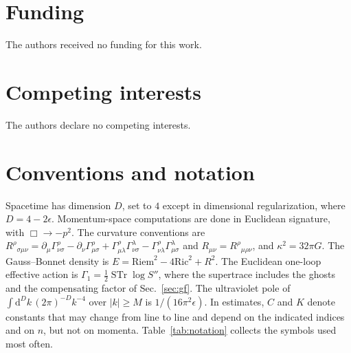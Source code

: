 \documentclass[aps,prd,10pt,twocolumn,superscriptaddress,nofootinbib,floatfix,longbibliography]{revtex4-2}
\newcommand{\dd}{\mathrm{d}}
\newcommand{\Ric}{\mathrm{Ric}}
\newcommand{\Riem}{\mathrm{Riem}}
\begin{document}
\section*{Funding}

The authors received no funding for this work.

\section*{Competing interests}

The authors declare no competing interests.

\appendix

\section{Conventions and notation}
\label{app:conventions}

Spacetime has dimension $D$, set to $4$ except in dimensional regularization, where $D=4-2\epsilon$. Momentum-space computations are done in Euclidean signature, with $\Box\to-p^2$. The curvature conventions are $R^\rho{}_{\sigma\mu\nu}=\partial_\mu\Gamma^\rho_{\nu\sigma}-\partial_\nu\Gamma^\rho_{\mu\sigma}+\Gamma^\rho_{\mu\lambda}\Gamma^\lambda_{\nu\sigma}-\Gamma^\rho_{\nu\lambda}\Gamma^\lambda_{\mu\sigma}$ and $R_{\mu\nu}=R^\rho{}_{\mu\rho\nu}$, and $\kappa^2=32\pi G$. The Gauss--Bonnet density is $E=\Riem^2-4\Ric^2+R^2$. The Euclidean one-loop effective action is $\Gamma_1=\frac12\operatorname{STr}\log S''$, where the supertrace includes the ghosts and the compensating factor of Sec.~\ref{sec:gf}. The ultraviolet pole of $\int\dd^Dk\,(2\pi)^{-D}k^{-4}$ over $|k|\ge M$ is $1/(16\pi^2\epsilon)$. In estimates, $C$ and $K$ denote constants that may change from line to line and depend on the indicated indices and on $n$, but not on momenta. Table~\ref{tab:notation} collects the symbols used most often.
\end{document}
